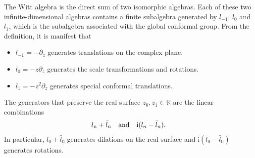 \documentclass[10pt]{article}
\newcommand{\ii}{\mathrm{i}}
\begin{document}
\begin{remark}
    The Witt algebra is the direct sum of two isomorphic algebras.
    Each of these two infinite-dimensional algebras contains a finite subalgebra generated by $l_{-1}$, $l_0$ and $l_1$, which is the subalgebra associated with the global conformal group.
    From the definition, it is manifest that
    \begin{itemize}
        \item $l_{-1}=-\partial_z$ generates translations on the complex plane.
        \item $l_{0}=-z\partial_z$ generates the scale transformations and rotations.
        \item $l_{1}=-z^2\partial_z$ generates special conformal translations.
    \end{itemize}
    
    The generators that preserve the real surface $z_0,z_1\in\mathbb{R}$ are the linear combinations
    \begin{align}
        l_n+\bar{l}_n\qq{and}\ii(l_n-\bar{l}_n).
    \end{align}
    In particular, $l_0+\bar{l}_0$ generates dilations on the real surface and $\ii\left(l_0-\bar{l}_0\right)$ generates rotations.
\end{remark}
\end{document}
